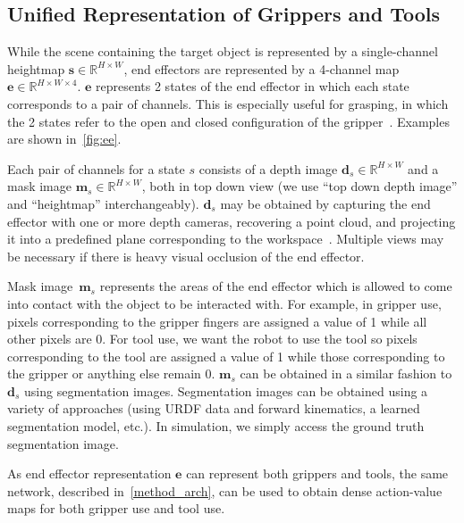 \documentclass[10pt,twocolumn,letterpaper]{article}
\begin{document}
\subsection{Unified Representation of Grippers and Tools}
\label{method_inputs}

While the scene containing the target object is represented by a single-channel heightmap $\mathbf{s} \in \mathbb{R}^{H \times W}$, end effectors are represented by a 4-channel map $\mathbf{e} \in \mathbb{R}^{H \times W \times 4}$. $\mathbf{e}$ represents 2 states of the end effector in which each state corresponds to a pair of channels. This is especially useful for grasping, in which the 2 states refer to the open and closed configuration of the gripper~\cite{xu2020adagrasp}. Examples are shown in~\cref{fig:ee}.

Each pair of channels for a state $s$ consists of a depth image $\mathbf{d}_s \in \mathbb{R}^{H \times W}$ and a mask image $\mathbf{m}_s \in \mathbb{R}^{H \times W}$, both in top down view (we use ``top down depth image'' and ``heightmap'' interchangeably). $\mathbf{d}_s$ may be obtained by capturing the end effector with one or more depth cameras, recovering a point cloud, and projecting it into a predefined plane corresponding to the workspace~\cite{zeng2020transporter}. Multiple views may be necessary if there is heavy visual occlusion of the end effector.

Mask image~$\mathbf{m}_s$ represents the areas of the end effector which is allowed to come into contact with the object to be interacted with. For example, in gripper use, pixels corresponding to the gripper fingers are assigned a value of 1 while all other pixels are 0. For tool use, we want the robot to use the tool so pixels corresponding to the tool are assigned a value of 1 while those corresponding to the gripper or anything else remain 0.
$\mathbf{m}_s$ can be obtained in a similar fashion to $\mathbf{d}_s$ using segmentation images. Segmentation images can be obtained using a variety of approaches (\eg using URDF data and forward kinematics, a learned segmentation model, etc.). In simulation, we simply access the ground truth segmentation image.

As end effector representation $\mathbf{e}$ can represent both grippers and tools, the same network, described in~\cref{method_arch}, can be used to obtain dense action-value maps for both gripper use and tool use. %
\end{document}
